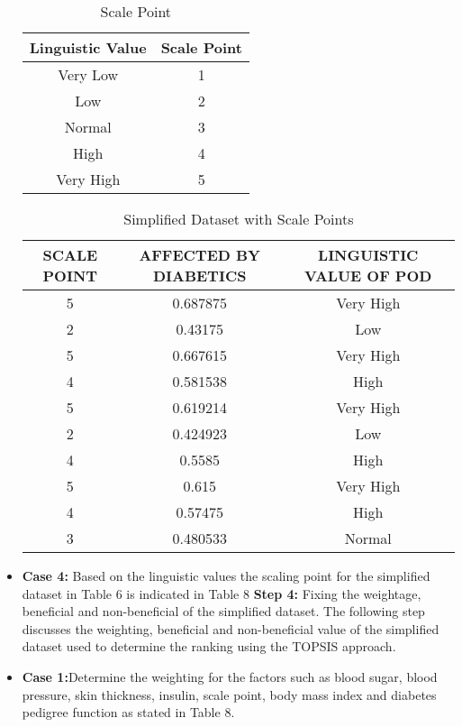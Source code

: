 \documentclass[12pt,a4paper]{article}
\begin{document}
\begin{itemize}
\begin{table}[h!]
\centering
\begin{tabular}{|c|c|}
\hline
\textbf{Linguistic Value} & \textbf{Scale Point} \\
\hline
Very Low & 1 \\
\hline
Low & 2 \\
\hline
Normal & 3 \\
\hline
High & 4 \\
\hline
Very High & 5 \\
\hline
\end{tabular}
\caption{Scale Point}
\end{table}
\vspace{0.5cm}

\begin{table}[h!]
\centering
\begin{tabular}{|c|c|c|}
\hline
\textbf{SCALE POINT} & \textbf{AFFECTED BY DIABETICS} & \textbf{LINGUISTIC VALUE OF POD} \\
\hline
5 & 0.687875 & Very High \\
\hline
2 & 0.43175 & Low \\
\hline
5 & 0.667615 & Very High \\
\hline
4 & 0.581538 & High \\
\hline
5 & 0.619214 & Very High \\
\hline
2 & 0.424923 & Low \\
\hline
4 & 0.5585 & High \\
\hline
5 & 0.615 & Very High \\
\hline
4 & 0.57475 & High \\
\hline
3 & 0.480533 & Normal\\
\hline
\end{tabular}
\caption{Simplified Dataset with Scale Points}
\end{table}

\item \textbf{Case 4:} Based on the linguistic values the scaling point for the simplified dataset in Table 6 is indicated in Table 8
\newpage
\textbf{Step 4:} Fixing the weightage, beneficial and non-beneficial of the simplified dataset. The following step discusses the weighting, beneficial and non-beneficial value of the simplified dataset used to determine the ranking using the TOPSIS approach.

\item \textbf{Case 1:}Determine the weighting for the factors such as blood sugar, blood pressure, skin thickness, insulin, scale point, body mass index and diabetes pedigree function as stated in Table 8.


\end{itemize}
\end{document}
